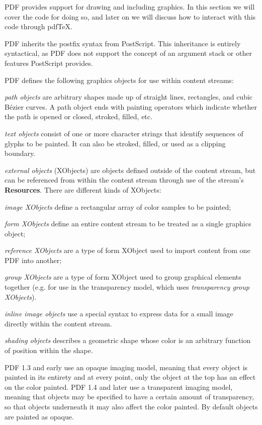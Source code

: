 PDF provides support for drawing and including graphics.
In this section we will cover the code for doing so, and later on we will discuss how to interact with this
code through pdf\TeX.

PDF inherits the postfix syntax from PostScript.
This inheritance is entirely syntactical, as PDF does not support the concept of an argument stack or other
features PostScript provides.

PDF defines the following graphics objects for use within content streams:
\blist
    \item {\it path objects} are arbitrary shapes made up of straight lines, rectangles, and cubic B\'ezier
    curves.
    A path object ends with painting operators which indicate whether the path is opened or closed, stroked,
    filled, etc.
    \item {\it text objects} consist of one or more character strings that identify sequences of glyphs to be
    painted.
    It can also be stroked, filled, or used as a clipping boundary.
    \item {\it external objects} (XObjects) are objects defined outside of the content stream, but can be
    referenced from within the content stream through use of the stream's {\bf Resources}.
    There are different kinds of XObjects:
    \blist
        \item {\it image XObjects} define a rectangular array of color samples to be painted;
        \item {\it form XObjects} define an entire content stream to be treated as a single graphics object;
        \item {\it reference XObjects} are a type of form XObject used to import content from one PDF into
        another;
        \item {\it group XObjects} are a type of form XObject used to group graphical elements together
        (e.g. for use in the transparency model, which uses {\it transparency group XObjects}).
    \elist
    \item {\it inline image objects} use a special syntax to express data for a small image directly within
    the content stream.
    \item {\it shading objects} describes a geometric shape whose color is an arbitrary function of position
    within the shape.
\elist

PDF 1.3 and early use an opaque imaging model, meaning that every object is painted in its entirety and at
every point, only the object at the top has an effect on the color painted.
PDF 1.4 and later use a transparent imaging model, meaning that objects may be specified to have a certain
amount of transparency, so that objects underneath it may also affect the color painted.
By default objects are painted as opaque.

